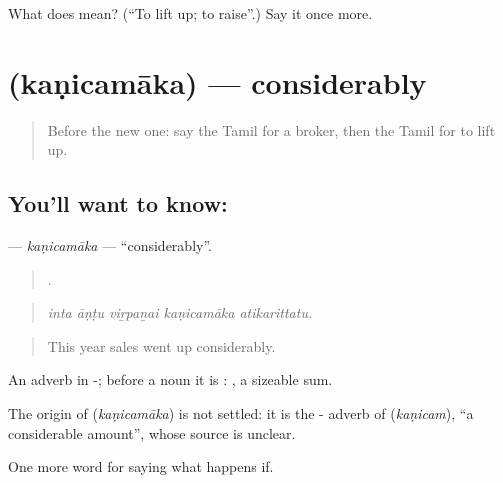 \begin{tcolorbox}[breakable,colback=teal!4,colframe=teal!35!black,title={Before you move on}]
What does  mean? (\textquotedblleft{}To lift up; to raise\textquotedblright{}.) Say it once more.
\end{tcolorbox}
\section[\texorpdfstring{\ta{கணிசமாக} (kaṇicamāka)}{கணிசமாக (kaṇicamāka)}]{ (kaṇicamāka) — considerably}

\label{lesson:TA-C545-kanicamaka}



\begin{quote}
Before the new one: say the Tamil for a broker, then the Tamil for to lift up.
\end{quote}

\subsection*{You'll want to know: }
\textbf{} — \emph{kaṇicamāka} — \textquotedblleft{}considerably\textquotedblright{}.

\begin{quote}
    .
\end{quote}

\begin{quote}
\emph{inta āṇṭu viṟpaṉai kaṇicamāka atikarittatu.}
\end{quote}

\begin{quote}
This year sales went up considerably.
\end{quote}

An adverb in -; before a noun it is :  , a sizeable sum.

\begin{cousinweb}
The origin of \textbf{} (\emph{kaṇicamāka}) is not settled: it is the - adverb of  (\emph{kaṇicam}), \textquotedblleft{}a considerable amount\textquotedblright{}, whose source is unclear.
\end{cousinweb}

\begin{grammarlens}[title={What you've built}]
One more word for saying what happens if.
\end{grammarlens}

